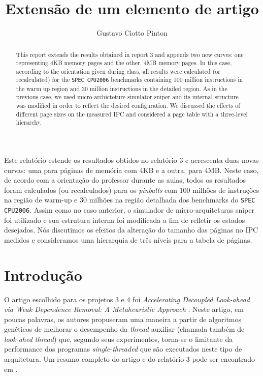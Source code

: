 \documentclass[12pt]{article}
\title{Extensão de um elemento de artigo}
\author{Gustavo Ciotto Pinton\inst{1} }
\begin{document}
 

\maketitle

\begin{abstract}
This report extends the results obtained in report 3 and appends two new curves:
one representing 4KB memory pages and the other, 4MB memory pages. In this case,
according to the orientation given during class, all results were
calculated (or recalculated) for the \texttt{SPEC CPU2006} benchmarks containing
100 million instructions in the warm up region and 30 million instructions in
the detailed region. As in the previous case, we used micro-archicteture
simulator sniper and its internal structure was modified in order to reflect the
desired configuration. We discussed the effects of different page sizes on
the measured IPC and considered a page table with a three-level hierarchy. 
\end{abstract}
     
\begin{resumo} 
Este relatório estende os resultados obtidos no relatório 3 e acrescenta duas
novas curvas: uma para páginas de memória com 4KB e a outra, para 4MB. Neste
caso, de acordo com a orientação do professor durante as aulas, todos os
resultados foram calculados (ou recalculados) para os \textit{pinballs} com 100
milhões de instruções na região de warm-up e 30 milhões na região detalhada dos
benchmarks do \texttt{SPEC CPU2006}. Assim como no caso anterior, o simulador de
micro-arquiteturas sniper foi utilizado e sua estrutura interna foi modificada a
fim de refletir os estados desejados. Nós discutimos os efeitos da alteração do
tamanho das páginas no IPC medidos e consideramos uma hierarquia de três níveis
para a tabela de páginas. 
\end{resumo}


\section{Introdução}

O artigo escolhido para os projetos 3 e 4 foi \textit{Accelerating Decoupled
Look-ahead via Weak Dependence Removal: A Metaheuristic Approach} \cite{artigo}.
Neste artigo, em poucas palavras, os autores propuseram uma maneira a partir de
algoritmos genéticos de melhorar o desempenho da \textit{thread} auxiliar
(chamada também de \textit{look-ahed thread}) que, segundo seus experimentos,
torna-se o limitante da performance dos programas \textit{single-threaded} que
são executados neste tipo de arquitetura. Um resumo completo do artigo e do
relatório 3 pode ser encontrado em \cite{relatorio3}.
\end{document}

